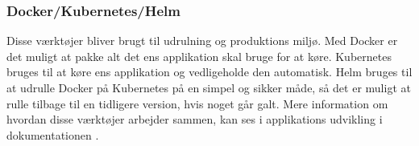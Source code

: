 \subsubsection{Docker/Kubernetes/Helm}

Disse værktøjer bliver brugt til udrulning og produktions miljø. Med Docker er det muligt at pakke alt det ens applikation skal bruge for at køre. Kubernetes bruges til at køre ens applikation og vedligeholde den automatisk. Helm bruges til at udrulle Docker på Kubernetes på en simpel og sikker måde, så det er muligt at rulle tilbage til en tidligere version, hvis noget går galt. Mere information om hvordan disse værktøjer arbejder sammen, kan ses i applikations udvikling i dokumentationen .

